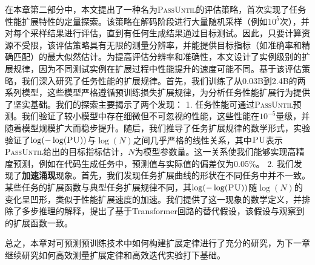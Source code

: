 在本章第二部分中，本文提出了一种名为\textsc{PassUntil}的评估策略，首次实现了任务性能扩展特性的定量探索。该策略在解码阶段进行大量随机采样（例如$10^5$次），并对每个采样结果进行评估，直到有任何生成结果通过目标测试。因此，只要计算资源不受限，该评估策略具有无限的测量分辨率，并能提供目标指标（如准确率和精确匹配）的最大似然估计。为提高评估分辨率和准确性，本文设计了实例级别的扩展规律，因为不同测试实例在扩展过程中性能提升的速度可能不同。基于该评估策略，我们深入研究了任务性能的扩展规律。首先，我们训练了从0.03B到2.4B的两系列模型，这些模型严格遵循预训练损失扩展规律，为分析任务性能扩展行为提供了坚实基础。我们的探索主要揭示了两个发现：
1. 任务性能可通过\textsc{PassUntil}预测。我们验证了较小模型中存在细微但不可忽视的性能，这些性能在$10^{-5}$量级，并随着模型规模扩大而稳步提升。随后，我们推导了{任务扩展规律}的数学形式，实验验证了\(\log(-\log(\textsc{PU}))\)与\(\log(N)\)之间几乎严格的线性关系，其中$\textsc{PU}$表示\textsc{PassUntil}给出的目标指标估计，$N$为模型参数量。这一关系使我们能够实现高精度预测，例如在代码生成任务中，预测值与实际值的偏差仅为0.05\%。
2. 我们发现了\textbf{加速涌现}现象。首先，我们发现任务扩展曲线的形状在不同任务中并不一致。某些任务的扩展函数与典型任务扩展规律不同，其\(\log(-\log(\textsc{PU}))\)随\(\log(N)\)的变化呈凹形，类似于性能扩展速度的加速。我们提供了这一现象的数学定义，并排除了多步推理的解释，提出了基于Transformer回路的替代假设，该假设与观察到的扩展函数一致。

总之，本章对可预测预训练技术中如何构建扩展定律进行了充分的研究，为下一章继续研究如何高效测量扩展定律和高效迭代实验打下基础。